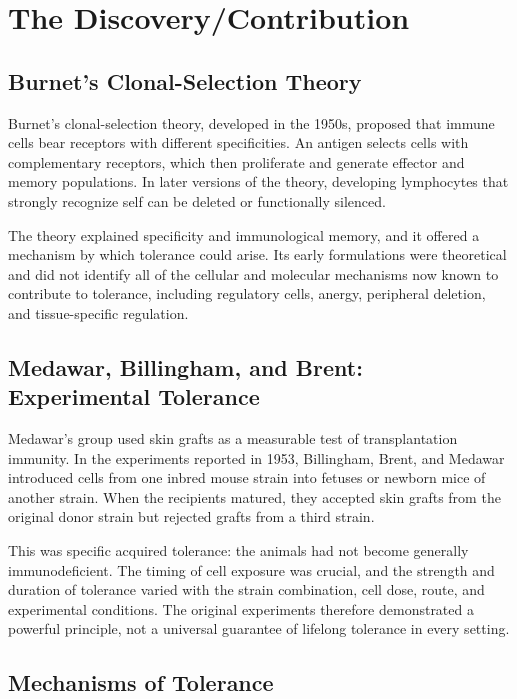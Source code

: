 \section{The Discovery/Contribution}

\subsection{Burnet's Clonal-Selection Theory}

Burnet's clonal-selection theory, developed in the 1950s, proposed that immune cells bear receptors with different specificities. An antigen selects cells with complementary receptors, which then proliferate and generate effector and memory populations. In later versions of the theory, developing lymphocytes that strongly recognize self can be deleted or functionally silenced.

The theory explained specificity and immunological memory, and it offered a mechanism by which tolerance could arise. Its early formulations were theoretical and did not identify all of the cellular and molecular mechanisms now known to contribute to tolerance, including regulatory cells, anergy, peripheral deletion, and tissue-specific regulation.

\subsection{Medawar, Billingham, and Brent: Experimental Tolerance}

Medawar's group used skin grafts as a measurable test of transplantation immunity. In the experiments reported in 1953, Billingham, Brent, and Medawar introduced cells from one inbred mouse strain into fetuses or newborn mice of another strain. When the recipients matured, they accepted skin grafts from the original donor strain but rejected grafts from a third strain.

This was specific acquired tolerance: the animals had not become generally immunodeficient. The timing of cell exposure was crucial, and the strength and duration of tolerance varied with the strain combination, cell dose, route, and experimental conditions. The original experiments therefore demonstrated a powerful principle, not a universal guarantee of lifelong tolerance in every setting.

\subsection{Mechanisms of Tolerance}

